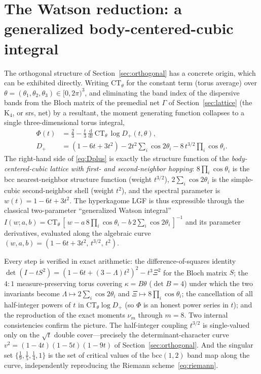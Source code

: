 \documentclass[cntp]{ipart}
\newcommand{\rmd}{\mathrm{d}}
\theoremstyle{plain}
\theoremstyle{remark}
\begin{document}
\section{The Watson reduction: a generalized body-centered-cubic integral}
\label{sec:watson}
The orthogonal structure of Section~\ref{sec:orthogonal} has a concrete origin, which can be exhibited directly.
Writing $\mathrm{CT}_\theta$ for the constant term (torus average) over $\theta=(\theta_1,\theta_2,\theta_3)\in
[0,2\pi)^3$, and eliminating the band index of the dispersive bands from the Bloch matrix of the premedial
net $\Gamma$ of Section~\ref{sec:lattice} (the $\mathrm{K}_4$, or srs, net) by a
resultant, the moment generating function collapses to a single three-dimensional torus integral,
\begin{equation}
\begin{split}
\Phi(t)&=\frac23-\frac t3\,\frac{\rmd}{\rmd t}\,\mathrm{CT}_\theta\,\log D_+(t,\theta),\\[2pt]
D_+&=(1-6t+3t^2)-2t^2\!\sum_{i}\cos2\theta_i-8\,t^{3/2}\!\prod_i\cos\theta_i .
\end{split}
\label{eq:Dplus}
\end{equation}
The right-hand side of \eqref{eq:Dplus} is exactly the structure function of the \emph{body-centered-cubic lattice
with first- and second-neighbor hopping}: $8\prod_i\cos\theta_i$ is the bcc nearest-neighbor structure function
(weight $t^{3/2}$), $2\sum_i\cos2\theta_i$ is the simple-cubic second-neighbor shell (weight $t^2$), and the
spectral parameter is $w(t)=1-6t+3t^2$. The hyperkagome LGF is thus expressible through the classical
two-parameter ``generalized Watson integral''
$I(w;a,b)=\mathrm{CT}_\theta\,[\,w-a\,8\!\prod_i\cos\theta_i-b\,2\!\sum_i\cos2\theta_i\,]^{-1}$ and its parameter
derivatives, evaluated along the algebraic curve $(w,a,b)=(1-6t+3t^2,\,t^{3/2},\,t^2)$.

Every step is verified in exact arithmetic: the difference-of-squares identity
$\det(I-tS^2)=(1-6t+(3-\Lambda)t^2)^2-t^3\Xi^2$ for the Bloch matrix $S$; the $4{:}1$ measure-preserving torus
covering $\kappa=B\theta$ ($\det B=4$) under which the two invariants become $\Lambda\mapsto2\sum_i\cos2\theta_i$ and
$\Xi\mapsto8\prod_i\cos\theta_i$; the cancellation of all half-integer powers of $t$ in
$\mathrm{CT}_\theta\log D_+$ (so $\Phi$ is an honest power series in $t$); and the reproduction of the exact moments
$\nu_m$ through $m=8$. Two internal consistencies confirm the picture. The half-integer coupling $t^{3/2}$ is
single-valued only on the $\sqrt t$ double cover---precisely the determinant-character curve
$v^2=(1-4t)(1-5t)(1-9t)$ of Section~\ref{sec:orthogonal}. And the singular set $\{\tfrac19,\tfrac15,\tfrac14,1\}$ is the
set of critical values of the bcc$(1,2)$ band map along the curve, independently reproducing the Riemann
scheme~\eqref{eq:riemann}.
\end{document}
